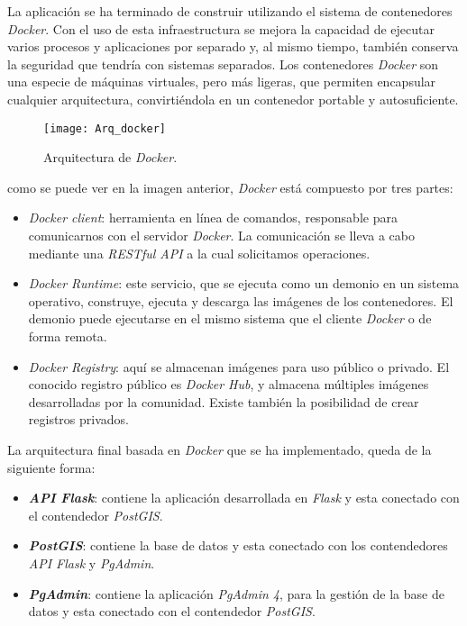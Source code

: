 La aplicación se ha terminado de construir utilizando el sistema de contenedores \emph{Docker}. Con el uso de esta infraestructura se mejora la capacidad de ejecutar varios procesos y aplicaciones por separado y, al mismo tiempo, también conserva la seguridad que tendría con sistemas separados. Los contenedores \emph{Docker} son una especie de máquinas virtuales, pero más ligeras, que permiten  encapsular cualquier arquitectura, convirtiéndola en un contenedor portable y autosuficiente. 


\begin{figure}[H]
	\centering
	\texttt{[image: Arq\_docker]}
	\caption{Arquitectura de \emph{Docker}\cite{arq_dock}.}
	\label{fig:Arq_docker}
\end{figure}

como se puede ver en la imagen anterior, \emph{Docker} está compuesto por tres partes:

\begin{itemize}
\item \emph{Docker client}: herramienta en línea de comandos, responsable para comunicarnos con el servidor \emph{Docker}. La comunicación se lleva a cabo mediante una \emph{RESTful API} a la cual solicitamos operaciones.

\item \emph{Docker Runtime}: este servicio, que se ejecuta como un demonio en un sistema operativo, construye, ejecuta y descarga las imágenes de los contenedores. El demonio puede ejecutarse en el mismo sistema que el cliente \emph{Docker} o de forma remota.

\item \emph{Docker Registry}: aquí se almacenan imágenes para uso público o privado. El conocido registro público es \emph{Docker Hub}, y almacena múltiples imágenes desarrolladas por la comunidad. Existe también la posibilidad de crear registros privados.

\end{itemize}

La arquitectura final basada en \emph{Docker} que se ha implementado, queda de la siguiente forma:

\begin{itemize}

\item \textbf{\emph{API Flask}}: contiene la aplicación desarrollada en \emph{Flask} y esta conectado con el contendedor \emph{PostGIS}.

\item \textbf{\emph{PostGIS}}: contiene la base de datos y esta conectado con los contendedores \emph{API Flask} y \emph{PgAdmin}.

\item \textbf{\emph{PgAdmin}}: contiene la aplicación \emph{PgAdmin 4}, para la gestión de la base de datos y esta conectado con el contendedor \emph{PostGIS}.
\end{itemize}

